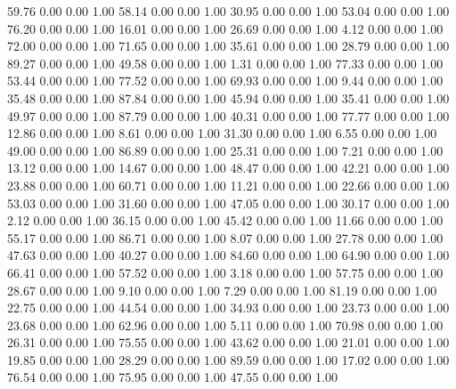    59.76   0.00   0.00   1.00
   58.14   0.00   0.00   1.00
   30.95   0.00   0.00   1.00
   53.04   0.00   0.00   1.00
   76.20   0.00   0.00   1.00
   16.01   0.00   0.00   1.00
   26.69   0.00   0.00   1.00
    4.12   0.00   0.00   1.00
   72.00   0.00   0.00   1.00
   71.65   0.00   0.00   1.00
   35.61   0.00   0.00   1.00
   28.79   0.00   0.00   1.00
   89.27   0.00   0.00   1.00
   49.58   0.00   0.00   1.00
    1.31   0.00   0.00   1.00
   77.33   0.00   0.00   1.00
   53.44   0.00   0.00   1.00
   77.52   0.00   0.00   1.00
   69.93   0.00   0.00   1.00
    9.44   0.00   0.00   1.00
   35.48   0.00   0.00   1.00
   87.84   0.00   0.00   1.00
   45.94   0.00   0.00   1.00
   35.41   0.00   0.00   1.00
   49.97   0.00   0.00   1.00
   87.79   0.00   0.00   1.00
   40.31   0.00   0.00   1.00
   77.77   0.00   0.00   1.00
   12.86   0.00   0.00   1.00
    8.61   0.00   0.00   1.00
   31.30   0.00   0.00   1.00
    6.55   0.00   0.00   1.00
   49.00   0.00   0.00   1.00
   86.89   0.00   0.00   1.00
   25.31   0.00   0.00   1.00
    7.21   0.00   0.00   1.00
   13.12   0.00   0.00   1.00
   14.67   0.00   0.00   1.00
   48.47   0.00   0.00   1.00
   42.21   0.00   0.00   1.00
   23.88   0.00   0.00   1.00
   60.71   0.00   0.00   1.00
   11.21   0.00   0.00   1.00
   22.66   0.00   0.00   1.00
   53.03   0.00   0.00   1.00
   31.60   0.00   0.00   1.00
   47.05   0.00   0.00   1.00
   30.17   0.00   0.00   1.00
    2.12   0.00   0.00   1.00
   36.15   0.00   0.00   1.00
   45.42   0.00   0.00   1.00
   11.66   0.00   0.00   1.00
   55.17   0.00   0.00   1.00
   86.71   0.00   0.00   1.00
    8.07   0.00   0.00   1.00
   27.78   0.00   0.00   1.00
   47.63   0.00   0.00   1.00
   40.27   0.00   0.00   1.00
   84.60   0.00   0.00   1.00
   64.90   0.00   0.00   1.00
   66.41   0.00   0.00   1.00
   57.52   0.00   0.00   1.00
    3.18   0.00   0.00   1.00
   57.75   0.00   0.00   1.00
   28.67   0.00   0.00   1.00
    9.10   0.00   0.00   1.00
    7.29   0.00   0.00   1.00
   81.19   0.00   0.00   1.00
   22.75   0.00   0.00   1.00
   44.54   0.00   0.00   1.00
   34.93   0.00   0.00   1.00
   23.73   0.00   0.00   1.00
   23.68   0.00   0.00   1.00
   62.96   0.00   0.00   1.00
    5.11   0.00   0.00   1.00
   70.98   0.00   0.00   1.00
   26.31   0.00   0.00   1.00
   75.55   0.00   0.00   1.00
   43.62   0.00   0.00   1.00
   21.01   0.00   0.00   1.00
   19.85   0.00   0.00   1.00
   28.29   0.00   0.00   1.00
   89.59   0.00   0.00   1.00
   17.02   0.00   0.00   1.00
   76.54   0.00   0.00   1.00
   75.95   0.00   0.00   1.00
   47.55   0.00   0.00   1.00
